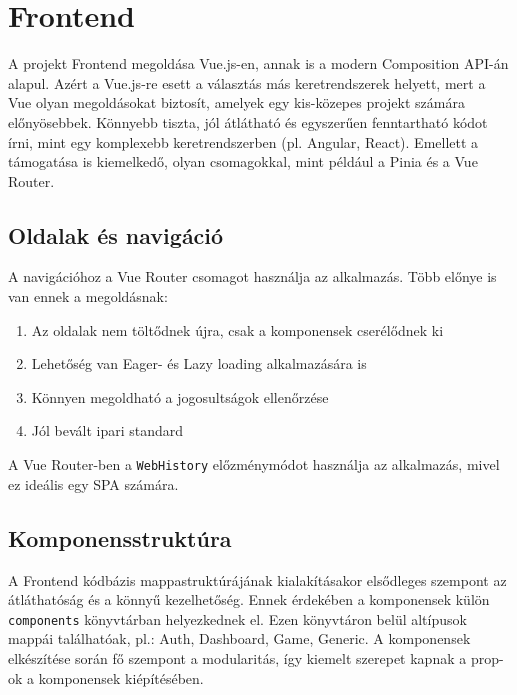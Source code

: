 \chapter{Frontend}
A projekt Frontend megoldása Vue.js-en, annak is a modern Composition API-án alapul. Azért a Vue.js-re esett a választás más keretrendszerek helyett, mert a Vue olyan megoldásokat biztosít, amelyek egy kis-közepes projekt számára előnyösebbek. Könnyebb tiszta, jól átlátható és egyszerűen fenntartható kódot írni, mint egy komplexebb keretrendszerben (pl. Angular, React). Emellett a támogatása is kiemelkedő, olyan csomagokkal, mint például a Pinia és a Vue Router.

\section{Oldalak és navigáció}
A navigációhoz a Vue Router csomagot használja az alkalmazás. Több előnye is van ennek a megoldásnak:
\begin{enumerate}
    \item Az oldalak nem töltődnek újra, csak a komponensek cserélődnek ki
    \item Lehetőség van Eager- és Lazy loading alkalmazására is
    \item Könnyen megoldható a jogosultságok ellenőrzése
    \item Jól bevált ipari standard
\end{enumerate}
A Vue Router-ben a \texttt{WebHistory} előzménymódot használja az alkalmazás, mivel ez ideális egy SPA számára. 

\section{Komponensstruktúra}
A Frontend kódbázis mappastruktúrájának kialakításakor elsődleges szempont az átláthatóság és a könnyű kezelhetőség. Ennek érdekében a komponensek külön \texttt{components} könyvtárban helyezkednek el. Ezen könyvtáron belül altípusok mappái találhatóak, pl.: Auth, Dashboard, Game, Generic. A komponensek elkészítése során fő szempont a modularitás, így kiemelt szerepet kapnak a prop-ok a komponensek kiépítésében.

